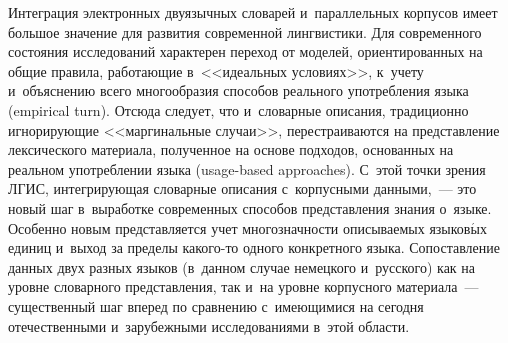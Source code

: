 \begin{multicols}{2}
  Интеграция электронных двуязычных словарей и~параллельных корпусов 
имеет большое значение для развития современной лингвистики. Для 
современного со\-сто\-яния исследований характерен переход от моделей, 
ориентированных на общие правила, ра\-бо\-та\-ющие в~<<идеальных условиях>>, 
к~учету и~объяснению всего многообразия способов реального употреб\-ле\-ния 
языка (empirical turn). Отсюда следует, что и~словарные описания, традиционно 
игнорирующие <<маргинальные случаи>>, перестраиваются на пред\-став\-ле\-ние 
лексического материала, полученное на основе подходов, основанных на 
реальном употреб\-ле\-нии языка (usage-based approaches). С~этой точки зрения 
ЛГИС, ин\-тег\-ри\-ру\-ющая словарные описания с~корпусными данными,~--- это 
новый шаг в~выработке современных способов пред\-став\-ле\-ния знания о~языке. 
Особенно новым представляется учет мно\-го\-знач\-ности опи\-сы\-ва\-емых 
языков$\acute{\mbox{ы}}$х единиц и~выход за пределы ка\-ко\-го-то одного 
конкретного языка. Со\-по\-став\-ле\-ние данных двух разных языков (в~данном 
случае немецкого и~русского) как на уровне словарного пред\-став\-ле\-ния, так и~на 
уровне корпусного материала~--- существенный шаг вперед по срав\-не\-нию 
с~име\-ющи\-ми\-ся на сегодня отечественными и~зарубежными 
исследованиями в~этой об\-ласти.

\vspace*{-7pt}
  
{\small\frenchspacing
 { %
 \begin{thebibliography}{99}
 
 \vspace*{-2pt}
 

\end{thebibliography}}}
\end{multicols}

